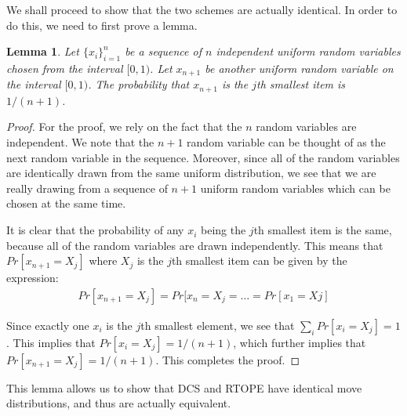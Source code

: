 \documentclass[12pt]{article}
\newtheorem{lemma}[theorem]{Lemma}
\begin{document}
  We shall proceed to show that the two schemes are actually identical. In order to do this, we need to first prove a lemma.
  \begin{lemma}
    Let $\{ x_i \}_{i=1}^n$ be a sequence of $n$ independent uniform random variables chosen from the interval $[0,1)$. Let $x_{n+1}$ be another uniform random variable on the interval $[0,1)$. The probability that $x_{n+1}$ is the $j$th smallest item is $1/(n+1)$.
  \end{lemma}
  \begin{proof}
    For the proof, we rely on the fact that the $n$ random variables are independent. We note that the $n+1$ random variable can be thought of as the next random variable in the sequence. Moreover, since all of the random variables are identically drawn from the same uniform distribution, we see that we are really drawing from a sequence of $n+1$ uniform random variables which can be chosen at the same time.

    It is clear that the probability of any $x_i$ being the $j$th smallest item is the same, because all of the random variables are drawn independently. This means that $Pr[x_{n+1} = X_{j}]$ where $X_j$ is the $j$th smallest item can be given by the expression:
    \begin{eqnarray}
      Pr[x_{n+1} = X_{j}] = Pr[x_{n} = X_{j} = \ldots = Pr[x_1 = X{j}]
    \end{eqnarray}

    Since exactly one $x_{i}$ is the $j$th smallest element, we see that $\sum_{i} Pr[x_i = X_j] = 1$. This implies that $Pr[x_i = X_j] = 1/(n+1)$, which further implies that $Pr[x_{n+1} = X_j] = 1/(n+1)$. This completes the proof.
  \end{proof}

  This lemma allows us to show that DCS and RTOPE have identical move distributions, and thus are actually equivalent.
\end{document}
